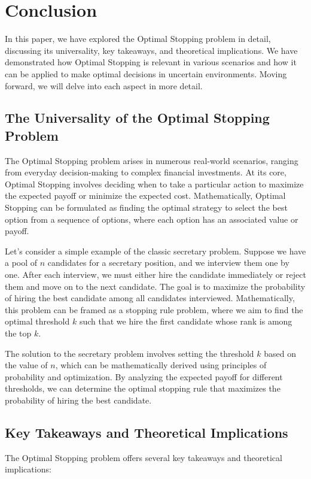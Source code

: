 \documentclass[12pt]{book} %
\begin{document}
\section{Conclusion}
In this paper, we have explored the Optimal Stopping problem in detail, discussing its universality, key takeaways, and theoretical implications. We have demonstrated how Optimal Stopping is relevant in various scenarios and how it can be applied to make optimal decisions in uncertain environments. Moving forward, we will delve into each aspect in more detail.

\subsection{The Universality of the Optimal Stopping Problem}
The Optimal Stopping problem arises in numerous real-world scenarios, ranging from everyday decision-making to complex financial investments. At its core, Optimal Stopping involves deciding when to take a particular action to maximize the expected payoff or minimize the expected cost. Mathematically, Optimal Stopping can be formulated as finding the optimal strategy to select the best option from a sequence of options, where each option has an associated value or payoff.

Let's consider a simple example of the classic secretary problem. Suppose we have a pool of \(n\) candidates for a secretary position, and we interview them one by one. After each interview, we must either hire the candidate immediately or reject them and move on to the next candidate. The goal is to maximize the probability of hiring the best candidate among all candidates interviewed. Mathematically, this problem can be framed as a stopping rule problem, where we aim to find the optimal threshold \(k\) such that we hire the first candidate whose rank is among the top \(k\).

The solution to the secretary problem involves setting the threshold \(k\) based on the value of \(n\), which can be mathematically derived using principles of probability and optimization. By analyzing the expected payoff for different thresholds, we can determine the optimal stopping rule that maximizes the probability of hiring the best candidate.

\subsection{Key Takeaways and Theoretical Implications}
The Optimal Stopping problem offers several key takeaways and theoretical implications:
\end{document}
